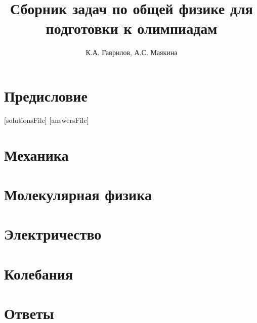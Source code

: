 \documentclass[a5paper, oneside]{book}
\title{Сборник задач по общей физике для подготовки к олимпиадам}
\author{К.А. Гаврилов, А.С. Маякина}
\begin{document}
\maketitle
\tableofcontents
{}

\chapter*{Предисловие}


[solutionsFile]
[answersFile]

\chapter{Механика}









\chapter{Молекулярная физика}



\chapter{Электричество}






\chapter{Колебания}





\chapter*{Ответы}
\end{document}
